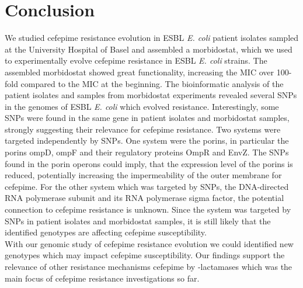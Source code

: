 \section{Conclusion}
We studied cefepime resistance evolution in ESBL \textit{E. coli} patient isolates sampled at the University Hospital of Basel and assembled a morbidostat, which we used to experimentally evolve cefepime resistance in ESBL \textit{E. coli} strains. The assembled morbidostat showed great functionality, increasing the MIC over 100-fold compared to the MIC at the beginning. The bioinformatic analysis of the patient isolates and samples from morbidostat experiments revealed several SNPs in the genomes of ESBL \textit{E. coli} which evolved resistance. Interestingly, some SNPs were found in the same gene in patient isolates and morbidostat samples, strongly suggesting their relevance for cefepime resistance. Two systems were targeted independently by SNPs. One system were the porins, in particular the porins ompD, ompF and their regulatory proteins OmpR and EnvZ. The SNPs found in the porin operons could imply, that the expression level of the porins is reduced, potentially increasing the impermeability of the outer membrane for cefepime. For the other system which was targeted by SNPs, the DNA-directed RNA polymerase subunit \textbeta \space and its RNA polymerase sigma factor, the potential connection to cefepime resistance is unknown. Since the system was targeted by SNPs in patient isolates and morbidostat samples, it is still likely that the identified genotypes are affecting cefepime susceptibility. \\
With our genomic study of cefepime resistance evolution we could identified new genotypes which may impact cefepime susceptibility. Our findings support the relevance of other resistance mechanisms cefepime by \textbeta-lactamases which was the main focus of cefepime resistance investigations so far.  
